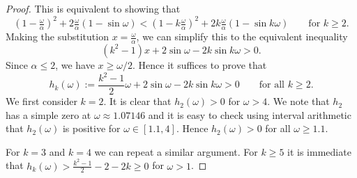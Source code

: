 \begin{proof}
	
This is equivalent to showing that 
\[
(1- \tfrac{\omega}{\alpha})^2 + 2 \tfrac{\omega}{\alpha} ( 1 - \sin \omega ) 
<
(1- k \tfrac{\omega}{\alpha})^2 + 2k  \tfrac{\omega}{\alpha} ( 1 - \sin k\omega )  
\qquad\text{for } k\geq 2.
\]
Making the substitution $ x = \tfrac{\omega}{\alpha}$, we can simplify this to the equivalent inequality 
\[
 (k^2-1) x  + 2  \sin \omega - 2k  \sin k\omega >0 .
\]
Since $\alpha \leq 2$, we have $x\geq \omega/2$. Hence it suffices to prove that
%
%
\begin{equation}
  h_k(\omega) := \frac{k^2-1}{2} \omega + 2 \sin \omega  - 2 k \sin k\omega  >0 
  \qquad\text{for all } k\geq 2.
\label{eq:GminRedux}
\end{equation}
We first consider $k=2$. It is clear that $h_2(\omega) > 0$ for $\omega > 4$.
We note that $h_2$ has a simple zero at $ \omega \approx 1.07146$ and it is easy to check using interval arithmetic that $h_2(\omega)$ is positive for $\omega \in [1.1,4]$. Hence $h_2(\omega) > 0$ for all $\omega \geq 1.1$.


For $k=3$ and $k=4$ we can repeat a similar argument. For $k \geq 5$ it is immediate that $h_k(\omega) > \frac{k^2-1}{2}-2-2k \geq 0$ for $\omega > 1$.
%
%
%
%
\end{proof}


